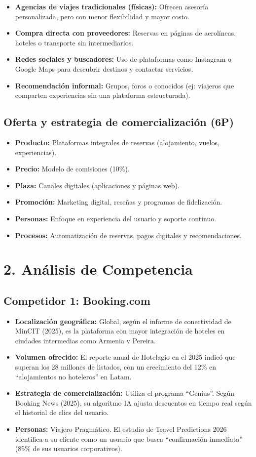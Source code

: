 \documentclass[12pt,a4paper]{article}
\newcommand{\sectiontitle}[1]{\section{#1}}
\newcommand{\subsectiontitle}[1]{\subsection{#1}}
\begin{document}
\begin{itemize}
    \item \textbf{Agencias de viajes tradicionales (físicas):} Ofrecen asesoría personalizada, pero con menor flexibilidad y mayor costo.
    \item \textbf{Compra directa con proveedores:} Reservas en páginas de aerolíneas, hoteles o transporte sin intermediarios.
    \item \textbf{Redes sociales y buscadores:} Uso de plataformas como Instagram o Google Maps para descubrir destinos y contactar servicios.
    \item \textbf{Recomendación informal:} Grupos, foros o conocidos (ej: viajeros que comparten experiencias sin una plataforma estructurada).
\end{itemize}

\subsectiontitle{Oferta y estrategia de comercialización (6P)}

\begin{itemize}
    \item \textbf{Producto:} Plataformas integrales de reservas (alojamiento, vuelos, experiencias).
    \item \textbf{Precio:} Modelo de comisiones (10\%).
    \item \textbf{Plaza:} Canales digitales (aplicaciones y páginas web).
    \item \textbf{Promoción:} Marketing digital, reseñas y programas de fidelización.
    \item \textbf{Personas:} Enfoque en experiencia del usuario y soporte continuo.
    \item \textbf{Procesos:} Automatización de reservas, pagos digitales y recomendaciones.
\end{itemize}

\sectiontitle{2. Análisis de Competencia}

\subsectiontitle{Competidor 1: Booking.com}

\begin{itemize}
    \item \textbf{Localización geográfica:} Global, según el informe de conectividad de MinCIT (2025), es la plataforma con mayor integración de hoteles en ciudades intermedias como Armenia y Pereira.
    \item \textbf{Volumen ofrecido:} El reporte anual de Hotelagio en el 2025 indicó que superan los 28 millones de listados, con un crecimiento del 12\% en ``alojamientos no hoteleros'' en Latam.
    \item \textbf{Estrategia de comercialización:} Utiliza el programa ``Genius''. Según Booking News (2025), su algoritmo IA ajusta descuentos en tiempo real según el historial de clics del usuario.
    \item \textbf{Personas:} Viajero Pragmático. El estudio de Travel Predictions 2026 identifica a su cliente como un usuario que busca ``confirmación inmediata'' (85\% de sus usuarios corporativos).
\end{itemize}
\end{document}
